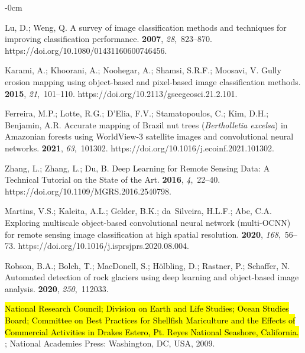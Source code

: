 \documentclass[remotesensing,article,accept,pdftex,moreauthors]{Definitions/mdpi}
\begin{document}
\begin{adjustwidth}{-\extralength}{0cm}
\begin{thebibliography}{999}
Lu, D.; Weng, Q.
\newblock A survey of image classification methods and techniques for improving
  classification performance.
 {\bf 2007}, {\em
  28},~823--870. https://doi.org/10.1080/01431160600746456.

Karami, A.; Khoorani, A.; Noohegar, A.; Shamsi, S.R.F.; Moosavi, V.
\newblock Gully erosion mapping using object-based and pixel-based image
  classification methods.
 {\bf 2015}, {\em
  21},~101--110.
\newblock https://doi.org/10.2113/gseegeosci.21.2.101.

Ferreira, M.P.; Lotte, R.G.; D'Elia, F.V.; Stamatopoulos, C.; Kim, D.H.;
  Benjamin, A.R.
\newblock Accurate mapping of Brazil nut trees (\emph{Bertholletia excelsa}) in
  Amazonian forests using WorldView-3 satellite images and convolutional neural
  networks.
 {\bf 2021}, {\em 63},~101302.
\newblock https://doi.org/10.1016/j.ecoinf.2021.101302.

Zhang, L.; Zhang, L.; Du, B.
\newblock Deep Learning for Remote Sensing Data: A Technical Tutorial on the
  State of the Art.
 {\bf 2016}, {\em
  4},~22--40.
\newblock https://doi.org/10.1109/MGRS.2016.2540798.

Martins, V.S.; Kaleita, A.L.; Gelder, B.K.; da~Silveira, H.L.F.; Abe, C.A.
\newblock Exploring multiscale object-based convolutional neural network
  (multi-OCNN) for remote sensing image classification at high spatial
  resolution.
 {\bf 2020},
  {\em 168},~56--73.
\newblock https://doi.org/10.1016/j.isprsjprs.2020.08.004.

Robson, B.A.; Bolch, T.; MacDonell, S.; Hölbling, D.; Rastner, P.; Schaffer,
  N.
\newblock Automated detection of rock glaciers using deep learning and
  object-based image analysis.
 {\bf 2020}, {\em 250},~112033.

\hl{National Research Council; Division on Earth and Life Studies; Ocean Studies Board; Committee on Best Practices for Shellfish Mariculture and the Effects of Commercial Activities in Drakes Estero, Pt. Reyes National Seashore, California.} %
; National Academies Press: Washington, DC, USA, 2009.


\end{thebibliography}
\end{adjustwidth}
\end{document}

